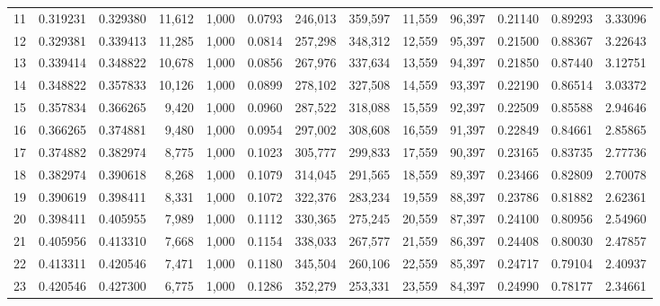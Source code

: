 \begin{tabular}{rrrrrrrrrrrrr}
11  &  0.319231 &  0.329380 &  11,612 &  1,000 &                                     0.0793 &  246,013 &  359,597 &   11,559 &   96,397 &  0.21140 &  0.89293 &  3.33096 \\
12  &  0.329381 &  0.339413 &  11,285 &  1,000 &                                     0.0814 &  257,298 &  348,312 &   12,559 &   95,397 &  0.21500 &  0.88367 &  3.22643 \\
13  &  0.339414 &  0.348822 &  10,678 &  1,000 &                                     0.0856 &  267,976 &  337,634 &   13,559 &   94,397 &  0.21850 &  0.87440 &  3.12751 \\
14  &  0.348822 &  0.357833 &  10,126 &  1,000 &                                     0.0899 &  278,102 &  327,508 &   14,559 &   93,397 &  0.22190 &  0.86514 &  3.03372 \\
15  &  0.357834 &  0.366265 &   9,420 &  1,000 &                                     0.0960 &  287,522 &  318,088 &   15,559 &   92,397 &  0.22509 &  0.85588 &  2.94646 \\
16  &  0.366265 &  0.374881 &   9,480 &  1,000 &                                     0.0954 &  297,002 &  308,608 &   16,559 &   91,397 &  0.22849 &  0.84661 &  2.85865 \\
17  &  0.374882 &  0.382974 &   8,775 &  1,000 &                                     0.1023 &  305,777 &  299,833 &   17,559 &   90,397 &  0.23165 &  0.83735 &  2.77736 \\
18  &  0.382974 &  0.390618 &   8,268 &  1,000 &                                     0.1079 &  314,045 &  291,565 &   18,559 &   89,397 &  0.23466 &  0.82809 &  2.70078 \\
19  &  0.390619 &  0.398411 &   8,331 &  1,000 &                                     0.1072 &  322,376 &  283,234 &   19,559 &   88,397 &  0.23786 &  0.81882 &  2.62361 \\
20  &  0.398411 &  0.405955 &   7,989 &  1,000 &                                     0.1112 &  330,365 &  275,245 &   20,559 &   87,397 &  0.24100 &  0.80956 &  2.54960 \\
21  &  0.405956 &  0.413310 &   7,668 &  1,000 &                                     0.1154 &  338,033 &  267,577 &   21,559 &   86,397 &  0.24408 &  0.80030 &  2.47857 \\
22  &  0.413311 &  0.420546 &   7,471 &  1,000 &                                     0.1180 &  345,504 &  260,106 &   22,559 &   85,397 &  0.24717 &  0.79104 &  2.40937 \\
23  &  0.420546 &  0.427300 &   6,775 &  1,000 &                                     0.1286 &  352,279 &  253,331 &   23,559 &   84,397 &  0.24990 &  0.78177 &  2.34661 \\

\end{tabular}

